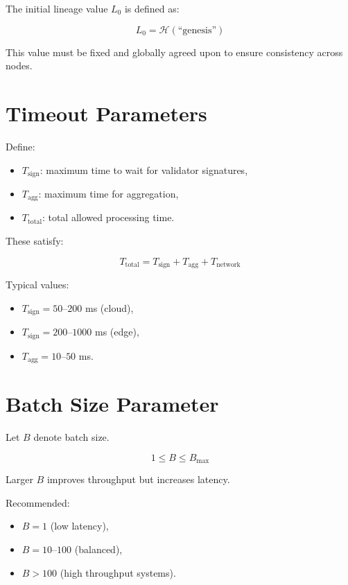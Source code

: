 The initial lineage value $L_0$ is defined as:

\begin{equation}
L_0 = \mathcal{H}(\text{``genesis''})
\end{equation}

This value must be fixed and globally agreed upon to ensure consistency across nodes.

\section{Timeout Parameters}

Define:

\begin{itemize}
\item $T_{\text{sign}}$: maximum time to wait for validator signatures,
\item $T_{\text{agg}}$: maximum time for aggregation,
\item $T_{\text{total}}$: total allowed processing time.
\end{itemize}

These satisfy:

\begin{equation}
T_{\text{total}} = T_{\text{sign}} + T_{\text{agg}} + T_{\text{network}}
\end{equation}

Typical values:

\begin{itemize}
\item $T_{\text{sign}} = 50$–$200$ ms (cloud),
\item $T_{\text{sign}} = 200$–$1000$ ms (edge),
\item $T_{\text{agg}} = 10$–$50$ ms.
\end{itemize}

\section{Batch Size Parameter}

Let $B$ denote batch size.

\begin{equation}
1 \leq B \leq B_{\max}
\end{equation}

Larger $B$ improves throughput but increases latency.

Recommended:

\begin{itemize}
\item $B = 1$ (low latency),
\item $B = 10$–$100$ (balanced),
\item $B > 100$ (high throughput systems).
\end{itemize}

